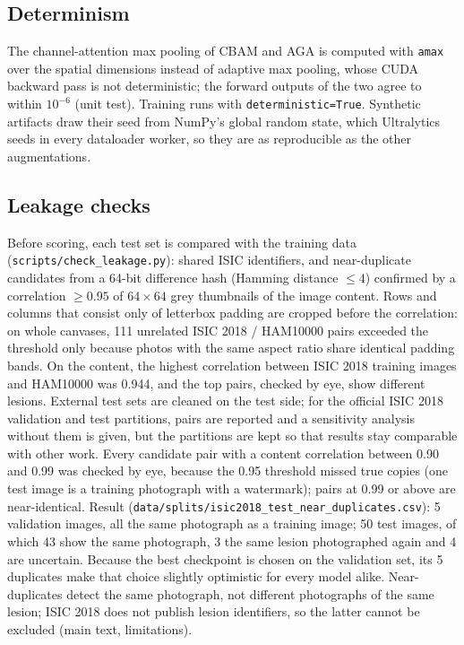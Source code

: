 \documentclass[10pt,a4paper]{article}
\begin{document}
\subsection{Determinism}
The channel-attention max pooling of CBAM and AGA is computed with \texttt{amax} over the spatial dimensions instead of adaptive max pooling, whose CUDA backward pass is not deterministic; the forward outputs of the two agree to within $10^{-6}$ (unit test). Training runs with \texttt{deterministic=True}. Synthetic artifacts draw their seed from NumPy's global random state, which Ultralytics seeds in every dataloader worker, so they are as reproducible as the other augmentations. 

\subsection{Leakage checks}
Before scoring, each test set is compared with the training data (\texttt{scripts/check\_leakage.py}): shared ISIC identifiers, and near-duplicate candidates from a 64-bit difference hash (Hamming distance $\le4$) confirmed by a correlation $\ge0.95$ of $64\times64$ grey thumbnails of the image content. Rows and columns that consist only of letterbox padding are cropped before the correlation: on whole canvases, 111 unrelated ISIC 2018 / HAM10000 pairs exceeded the threshold only because photos with the same aspect ratio share identical padding bands. On the content, the highest correlation between ISIC 2018 training images and HAM10000 was 0.944, and the top pairs, checked by eye, show different lesions. External test sets are cleaned on the test side; for the official ISIC 2018 validation and test partitions, pairs are reported and a sensitivity analysis without them is given, but the partitions are kept so that results stay comparable with other work. Every candidate pair with a content correlation between 0.90 and 0.99 was checked by eye, because the 0.95 threshold missed true copies (one test image is a training photograph with a watermark); pairs at 0.99 or above are near-identical. Result (\texttt{data/splits/isic2018\_test\_near\_duplicates.csv}): 5 validation images, all the same photograph as a training image; 50 test images, of which 43 show the same photograph, 3 the same lesion photographed again and 4 are uncertain. Because the best checkpoint is chosen on the validation set, its 5 duplicates make that choice slightly optimistic for every model alike. Near-duplicates detect the same photograph, not different photographs of the same lesion; ISIC 2018 does not publish lesion identifiers, so the latter cannot be excluded (main text, limitations).
\end{document}
